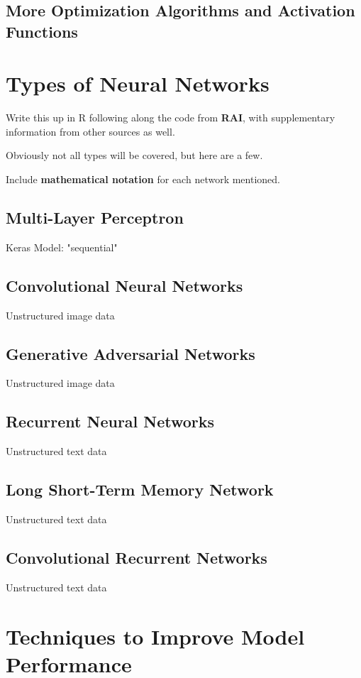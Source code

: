 \subsection{More Optimization Algorithms and Activation Functions}

\section{Types of Neural Networks} %

Write this up in R following along the code from \textbf{RAI}, with supplementary information from other sources as well.  

Obviously not all types will be covered, but here are a few.  

Include \textbf{mathematical notation} for each network mentioned.

\subsection{Multi-Layer Perceptron}
Keras Model: "sequential"

\subsection{Convolutional Neural Networks}
Unstructured image data

\subsection{Generative Adversarial Networks}
Unstructured image data

\subsection{Recurrent Neural Networks}
Unstructured text data

\subsection{Long Short-Term Memory Network}
Unstructured text data

\subsection{Convolutional Recurrent Networks}
Unstructured text data

\section{Techniques to Improve Model Performance} %

